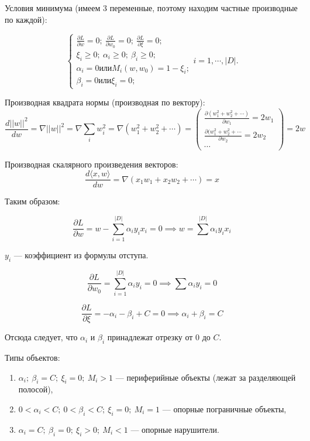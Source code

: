 Условия минимума (имеем 3 переменные, поэтому находим частные производные по
каждой):

\[
    \begin{cases}
        \frac{\partial L}{\partial w} = 0;\ 
        \frac{\partial L}{\partial w_0} = 0;\ 
        \frac{\partial L}{\partial \xi} = 0;
        \\
        \xi_i \geq 0;\ \alpha_i \geq 0;\ \beta_i \geq 0;
        \\
        \alpha_i = 0 \text{или} M_i(w, w_0) = 1 - \xi_i;
        \\
        \beta_i = 0 \text{или} \xi_i = 0;
    \end{cases} i = 1, \cdots, |D|.
\]

Производная квадрата нормы (производная по вектору):
\[
    \frac{d||w||^2}{dw} = \nabla ||w||^2 = \nabla \sum_i w_i^2 = \nabla (w_1^2 +
    w_2^2 + \cdots) =
    \begin{pmatrix}
        \frac{\partial (w_1^2 + w_2^2 + \cdots)}{\partial w_1} = 2w_1
        \\
        \frac{\partial (w_1^2 + w_2^2 + \cdots}{\partial w_2} = 2 w_2
        \\
        \cdots
    \end{pmatrix} =
    2w
\]

Производная скалярного произведения векторов:
\[
    \frac{d \langle x, w \rangle}{dw} = \nabla (x_1 w_1 + x_2 w_2 + \cdots) = x
\]

Таким образом:

\[
    \frac{\partial L }{\partial w} = w - \sum_{i=1}^{|D|} \alpha_i y_i x_i = 0
    \implies w = \sum^{|D|} \alpha_i y_i x_i
\]

$y_i$ --- коэффициент из формулы отступа.

\[
    \frac{\partial L}{\partial w_0} = \sum^{|D|}_{i=1} \alpha_i y_i = 0
    \implies \sum \alpha_i y_i = 0
\]

\[
    \frac{\partial L}{\partial \xi} = - \alpha_i - \beta_i + C = 0 \implies
    \alpha_i + \beta_i = C
\]

Отсюда следует, что $\alpha_i$ и $\beta_i$ принадлежат отрезку от 0 до $C$.

Типы объектов:
\begin{enumerate}
    \item $\alpha_i;\ \beta_i = C;\ \xi_i = 0;\ M_i > 1$ --- периферийные
        объекты (лежат за разделяющей полосой),

    \item $0 < \alpha_i < C;\ 0 < \beta_i < C;\ \xi_i = 0;\ M_i = 1$ ---
        опорные пограничные объекты,

    \item  $\alpha_i = C;\ \beta_i = 0;\ \xi_i > 0;\ M_i < 1$ --- опорные
        нарушители.
\end{enumerate}

